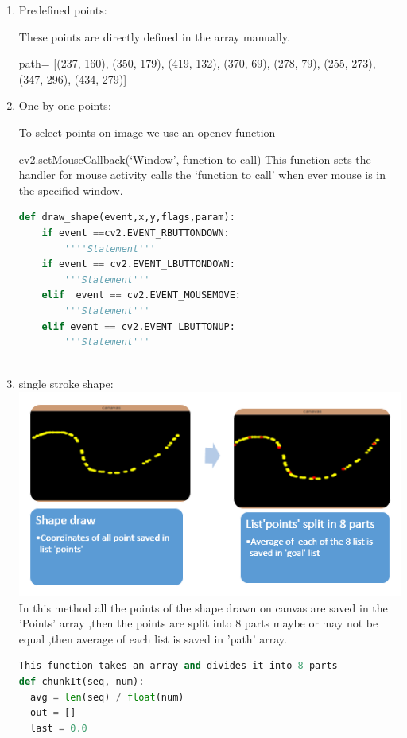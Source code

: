 \documentclass[main.tex]{subfiles}
\begin{document}
\begin{enumerate}
\item Predefined points:

These points are directly defined in the array manually.

path= [(237, 160), (350, 179), (419, 132), (370, 69), (278, 79), (255, 273), (347, 296), (434, 279)]

\item One by one points:

To select points on image we use an opencv function 

cv2.setMouseCallback(`Window', function to call)
This function sets the handler for mouse activity calls the `function to call' when ever mouse is in the specified window.
\begin{lstlisting}[language=Python, caption = Mouse activity call back function]
def draw_shape(event,x,y,flags,param):
    if event ==cv2.EVENT_RBUTTONDOWN:
    	''''Statement'''
    if event == cv2.EVENT_LBUTTONDOWN:
    	'''Statement'''
    elif  event == cv2.EVENT_MOUSEMOVE:
    	'''Statement'''            
    elif event == cv2.EVENT_LBUTTONUP:
    	'''Statement'''
        
\end{lstlisting}


\item single stroke shape:
\\
\includegraphics[scale=1]{images/shapedraw.png}
In this method all the points of the shape drawn on canvas are saved in the 'Points' array ,then the points are split into 8 parts maybe or may not be equal ,then average of each list is saved in 'path' array.

\begin{lstlisting}[language=Python, caption = Point selection from a shape]
This function takes an array and divides it into 8 parts
def chunkIt(seq, num):
  avg = len(seq) / float(num)
  out = []
  last = 0.0


\end{lstlisting}
\end{enumerate}
\end{document}
